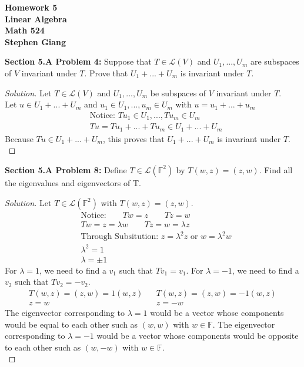 \documentclass[12pt]{article}
\begin{document}
	
	\begin{center}
		\textbf{Homework 5} \\
		\textbf{Linear Algebra} \\
		\textbf{Math 524} \\
		\textbf{Stephen Giang} \\
	\end{center}

\noindent \textbf{Section 5.A Problem 4: } Suppose that $T \in \mathcal{L}(V)$ and $U_1, ...,U_m$ are subspaces of $V$ invariant under $T$.  Prove that $U_1 + ... + U_m$ is invariant under $T$.
	\begin{proof}[Solution]
		Let $T \in \mathcal{L}(V)$ and $U_1, ...,U_m$ be subspaces of $V$ invariant under $T$. \\ Let $u \in U_1 + ... + U_m$ and $u_1 \in U_1 , ..., u_m \in U_m$ with $u = u_1 + ... + u_m $
		\begin{align*}
			&\text{Notice: } Tu_1 \in U_1, ..., Tu_m \in U_m \\
			&Tu = Tu_1 + ... + Tu_m \in U_1 + ... + U_m
		\end{align*}
		Because $Tu \in U_1 + ... + U_m$, this proves that $U_1 + ... + U_m$ is invariant under $T$. \\
	\end{proof} 
\vspace{\baselineskip}

\noindent \textbf{Section 5.A Problem 8: } Define $T \in \mathcal{L}(\mathbb{F}^2)$ by $T(w,z) = (z, w)$. Find all the eigenvalues and eigenvectors of T.
	\begin{proof}[Solution]
		Let $T \in \mathcal{L}(\mathbb{F}^2)$ with $T(w,z) = (z, w)$.
		\begin{align*}
			&\text{Notice:} \qquad Tw = z \qquad Tz = w \\
			&Tw = z = \lambda w \qquad Tz = w = \lambda z \\
			&\text{Through Subsitution: } z = \lambda ^2 z \text{ or } w = \lambda ^2 w \\
			&\lambda ^2 = 1 \\
			&\lambda = \pm 1
		\end{align*}
		For $\lambda = 1$, we need to find a $v_1$ such that $Tv_1 = v_1$. For $\lambda = -1$, we need to find a $v_2$ such that $Tv_2 = -v_2$.
		\begin{align*}
			T(w,z) = (z,w) = 1(w,z) && T(w,z) = (z,w) = -1(w,z) \\
			z = w && z = -w 
		\end{align*}
		The eigenvector corresponding to $\lambda = 1$ would be a vector whose components would be equal to each other such as $(w,w)$ with $w \in \mathbb{F}$. The eigenvector corresponding to $\lambda = -1$ would be a vector whose components would be opposite to each other such as $(w,-w)$ with $w \in \mathbb{F}$.  \\
	\end{proof}
\newpage 
\end{document}
